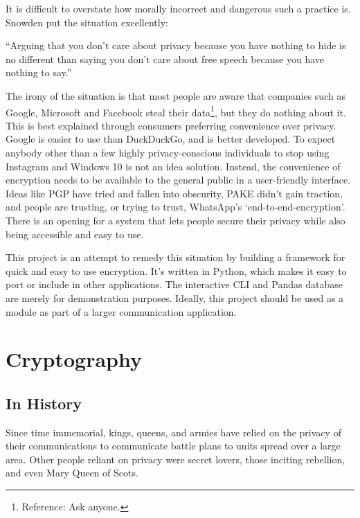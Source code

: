 \documentclass{article}
\begin{document}
It is difficult to overstate how morally incorrect and dangerous such a practice is. Snowden put the
situation excellently:

\begin{displayquote}
  ``Arguing that you don't care about privacy because you have nothing to hide is no different than
  saying you don't care about free speech because you have nothing to say.''
\end{displayquote}

The irony of the situation is that most people are aware that companies such as Google, Microsoft and Facebook
steal their data\footnote{Reference: Ask anyone.}, but they do nothing about it. This is best
explained through consumers preferring convenience over privacy. Google is easier to use than
DuckDuckGo, and is better developed. To expect anybody other than a few highly privacy-conscious
individuals to stop using Instagram and Windows 10 is not an idea solution. Instead, the convenience
of encryption needs to be available to the general public in a user-friendly interface. Ideas like
PGP have tried and fallen into obscurity, PAKE didn't gain traction\cite{pake}, and people are
trusting, or trying to trust, WhatsApp's `end-to-end-encryption'. There is an opening for a system
that lets people secure their privacy while also being accessible and easy to
use.\cite{hackernews}\cite{gtank}

This project is an attempt to remedy this situation by building a framework for quick and easy to
use encryption. It's written in Python, which makes it easy to port or include in other
applications. The interactive CLI and Pandas database are merely for demonstration purposes.
Ideally, this project should be used as a module as part of a larger communication application.

\newpage

\section{Cryptography}

\subsection{In History}
Since time immemorial, kings, queens, and armies have relied on the privacy of their communications
to communicate battle plans to units spread over a large area. Other people reliant on privacy were
secret lovers, those inciting rebellion, and even Mary Queen of Scots.
\end{document}
